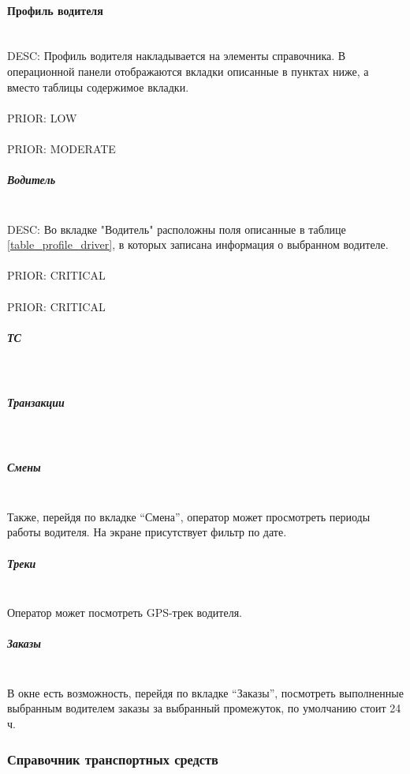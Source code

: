         \paragraph{Профиль водителя} \mbox{} \label{profile_driver} \\

        	DESC: Профиль водителя накладывается на элементы справочника. В операционной панели отображаются вкладки описанные в пунктах ниже, а вместо таблицы содержимое вкладки.\\

        	\\
        	PRIOR: LOW\\

			\\
			PRIOR: MODERATE\\

        	\subparagraph{Водитель} \mbox{} \\

        		DESC: Во вкладке "Водитель" расположны поля описанные в таблице \ref{table_profile_driver}, в которых записана информация о выбранном водителе.\\

        		\\
        		PRIOR: CRITICAL\\

        		\\
        		PRIOR: CRITICAL\\

        	\subparagraph{ТС} \mbox{} \\

        	\subparagraph{Транзакции} \mbox{} \\

        	\subparagraph{Смены} \mbox{} \\

        		Также, перейдя по вкладке “Смена”, оператор может просмотреть периоды работы водителя. На экране присутствует фильтр по дате.

        	\subparagraph{Треки} \mbox{} \\

        		Оператор может посмотреть GPS-трек водителя.

        	\subparagraph{Заказы} \mbox{} \\

        		В окне есть возможность, перейдя по вкладке “Заказы”, посмотреть выполненные выбранным водителем заказы за выбранный промежуток, по умолчанию стоит 24 ч.

    \subsubsection{Справочник транспортных средств}

